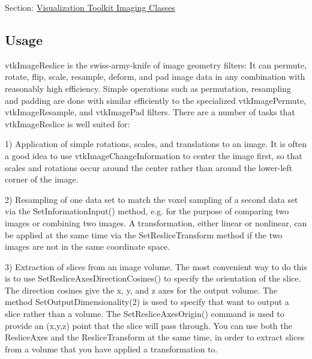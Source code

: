Section\-: \hyperlink{sec_vtkimaging}{Visualization Toolkit Imaging Classes} \hypertarget{vtkwidgets_vtkxyplotwidget_Usage}{}\subsection{Usage}\label{vtkwidgets_vtkxyplotwidget_Usage}
vtk\-Image\-Reslice is the swiss-\/army-\/knife of image geometry filters\-: It can permute, rotate, flip, scale, resample, deform, and pad image data in any combination with reasonably high efficiency. Simple operations such as permutation, resampling and padding are done with similar efficiently to the specialized vtk\-Image\-Permute, vtk\-Image\-Resample, and vtk\-Image\-Pad filters. There are a number of tasks that vtk\-Image\-Reslice is well suited for\-: 

1) Application of simple rotations, scales, and translations to an image. It is often a good idea to use vtk\-Image\-Change\-Information to center the image first, so that scales and rotations occur around the center rather than around the lower-\/left corner of the image. 

2) Resampling of one data set to match the voxel sampling of a second data set via the Set\-Information\-Input() method, e.\-g. for the purpose of comparing two images or combining two images. A transformation, either linear or nonlinear, can be applied at the same time via the Set\-Reslice\-Transform method if the two images are not in the same coordinate space. 

3) Extraction of slices from an image volume. The most convenient way to do this is to use Set\-Reslice\-Axes\-Direction\-Cosines() to specify the orientation of the slice. The direction cosines give the x, y, and z axes for the output volume. The method Set\-Output\-Dimensionality(2) is used to specify that want to output a slice rather than a volume. The Set\-Reslice\-Axes\-Origin() command is used to provide an (x,y,z) point that the slice will pass through. You can use both the Reslice\-Axes and the Reslice\-Transform at the same time, in order to extract slices from a volume that you have applied a transformation to.

